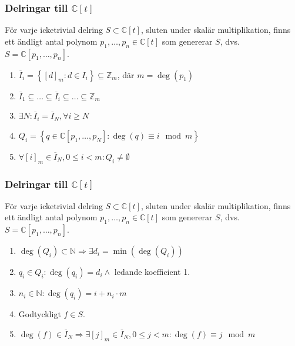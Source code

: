 \documentclass{beamer}
\begin{document}
\begin{frame}
	\frametitle{Delringar till $\mathbb{C}[t]$}
	\begin{Theorem}
		För varje icketrivial delring $S \subset \mathbb{C}[t]$, sluten under skalär multiplikation, finns ett ändligt antal polynom $p_1,\ldots,p_n \in \mathbb{C}[t]$ som genererar $S$, dvs. $S=\mathbb{C}[p_1,\ldots,p_n]$.
	\end{Theorem}
	
	\begin{enumerate}
		\item<1->$\overline{I}_i=\left\{[d]_m:d\in I_i \right\} \subseteq \mathbb{Z}_m$, där $m=\deg(p_1)$
		\item<2->$\overline{I}_1 \subseteq \ldots \subseteq \overline{I}_i \subseteq \ldots \subseteq \mathbb{Z}_m$
		\item<3->$\exists N : \overline{I}_i = \overline{I}_N, \forall i \geq N$
		\item<4->$Q_i=\left\{q \in \mathbb{C}[p_1,\ldots,p_N] : \deg(q) \equiv i \mod{m}\right\}$
		\item<5->$\forall [i]_m \in \overline{I}_N, 0 \leq i < m : Q_i \neq \emptyset$
	\end{enumerate}
\end{frame}

\begin{frame}
	\frametitle{Delringar till $\mathbb{C}[t]$}
	\begin{Theorem}
		För varje icketrivial delring $S \subset \mathbb{C}[t]$, sluten under skalär multiplikation, finns ett ändligt antal polynom $p_1,\ldots,p_n \in \mathbb{C}[t]$ som genererar $S$, dvs. $S=\mathbb{C}[p_1,\ldots,p_n]$.
	\end{Theorem}
	
	\begin{enumerate}
		\item<1->$\deg(Q_i) \subset \mathbb{N} \Longrightarrow \exists d_i=\min(\deg(Q_i))$
		\item<2->$q_i \in Q_i: \deg(q_i)=d_i \wedge$ ledande koefficient 1.
		\item<3->$n_i \in \mathbb{N} : \deg(q_i) = i + n_i \cdot m$
		\item<4->Godtyckligt $f \in S$.
		\item<5->$\deg(f)\in \overline{I}_N \Longrightarrow \exists [j]_m \in \overline{I}_N, 0 \leq j < m : \deg(f) \equiv j \mod{m}$
	\end{enumerate}
\end{frame}
\end{document}
